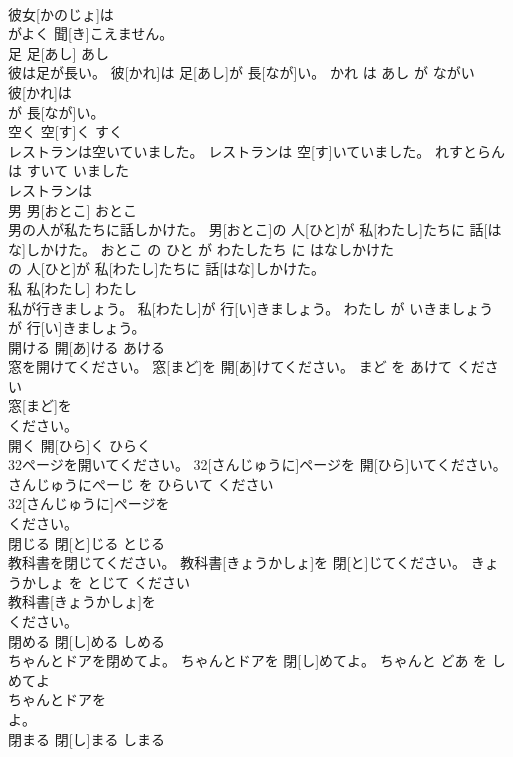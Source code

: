 \documentclass[8pt]{extreport}
\begin{document}
\begin{CJK}{UTF8}{min}
\\	彼女[かのじょ]は
\\	がよく 聞[き]こえません。			
\\	足	足[あし]	あし	
\\	彼は足が長い。	彼[かれ]は 足[あし]が 長[なが]い。	かれ は あし が ながい	
\\	彼[かれ]は
\\	が 長[なが]い。			
\\	空く	空[す]く	すく	
\\	レストランは空いていました。	レストランは 空[す]いていました。	れすとらん は すいて いました	
\\	レストランは
\\	男	男[おとこ]	おとこ	
\\	男の人が私たちに話しかけた。	男[おとこ]の 人[ひと]が 私[わたし]たちに 話[はな]しかけた。	おとこ の ひと が わたしたち に はなしかけた	
\\	の 人[ひと]が 私[わたし]たちに 話[はな]しかけた。			
\\	私	私[わたし]	わたし	
\\	私が行きましょう。	私[わたし]が 行[い]きましょう。	わたし が いきましょう	
\\	が 行[い]きましょう。			
\\	開ける	開[あ]ける	あける	
\\	窓を開けてください。	窓[まど]を 開[あ]けてください。	まど を あけて ください	
\\	窓[まど]を
\\	ください。			
\\	開く	開[ひら]く	ひらく	
\\	32ページを開いてください。	32[さんじゅうに]ページを 開[ひら]いてください。	さんじゅうにぺーじ を ひらいて ください	
\\	32[さんじゅうに]ページを
\\	ください。			
\\	閉じる	閉[と]じる	とじる	
\\	教科書を閉じてください。	教科書[きょうかしょ]を 閉[と]じてください。	きょうかしょ を とじて ください	
\\	教科書[きょうかしょ]を
\\	ください。			
\\	閉める	閉[し]める	しめる	
\\	ちゃんとドアを閉めてよ。	ちゃんとドアを 閉[し]めてよ。	ちゃんと どあ を しめてよ	
\\	ちゃんとドアを
\\	よ。			
\\	閉まる	閉[し]まる	しまる	

\end{CJK}
\end{document}

